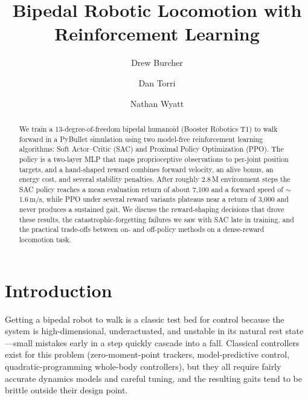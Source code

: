 \documentclass[sigconf,nonacm]{acmart}
\begin{document}
\title{Bipedal Robotic Locomotion with Reinforcement Learning}

\author{Drew Burcher}

\author{Dan Torri}

\author{Nathan Wyatt}

\renewcommand{\shortauthors}{Burcher, Torri, and Wyatt}

\begin{abstract}
We train a 13-degree-of-freedom bipedal humanoid (Booster Robotics T1) to walk forward in
a PyBullet simulation using two model-free reinforcement learning algorithms:
Soft Actor--Critic (SAC) and Proximal Policy Optimization (PPO). The policy is a
two-layer MLP that maps proprioceptive observations to per-joint position targets,
and a hand-shaped reward combines forward velocity, an alive bonus, an energy cost,
and several stability penalties. After roughly 2.8\,M environment steps the SAC
policy reaches a mean evaluation return of about 7{,}100 and a forward speed of
$\sim$1.6\,m/s, while PPO under several reward variants plateaus near a return of
3{,}000 and never produces a sustained gait. We discuss the reward-shaping decisions
that drove these results, the catastrophic-forgetting failures we saw with SAC late
in training, and the practical trade-offs between on- and off-policy methods on a
dense-reward locomotion task.
\end{abstract}


\maketitle

\section{Introduction}
Getting a bipedal robot to walk is a classic test bed for control because the
system is high-dimensional, underactuated, and unstable in its natural rest
state---small mistakes early in a step quickly cascade into a fall. Classical
controllers exist for this problem (zero-moment-point trackers, model-predictive
control, quadratic-programming whole-body controllers), but they all require
fairly accurate dynamics models and careful tuning, and the resulting gaits tend
to be brittle outside their design point.
\end{document}
